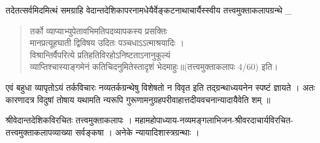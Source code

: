 तदेतत्सर्वमिदमित्थं समग्राहि वेदान्तदेशिकापरनामधेयैर्वेङ्कटनाथाचार्यैस्स्वीय तत्त्वमुक्ताकलापग्रन्थे \_
\begin{verse}
तर्को व्याप्याभ्युपेतावभिमतिपदव्यापकस्य प्रसक्तिः\\
मानप्रत्यूहघाती द्विविषय उदितः पञ्चधाऽऽत्माश्रयादिः ।\\
विश्रान्तिर्वैपरित्ये प्रतिहतिविरहोऽनिष्टताऽनानुकूल्यं\\
व्याप्तिश्चास्याङ्गमेनं कतिचिदनुमितेस्तादृशं भेदमाहुः॥(तत्त्वमुक्ताकलापः  4/60) इति।
\end{verse}
एवं बहुधा व्यापृतोऽयं तर्कविचारः नव्यतर्कग्रन्थेषु विशेषतो न विवृत इति तद्ग्रन्थाध्ययनेन स्पष्टं ज्ञायते । अतः कारणादत्र विदुषां तोषाय यथामति न्यरूपि गुरूणामनुग्रहपरीवाहात्तदीयवचनान्यादायैवेति शम् ॥

\begin{thebibliography}{99}
	श्रीवेदान्तदेशिकविरचितः तत्त्वमुक्ताकलापः ।
	महामहोपाध्याय-नव्यमङ्गलाभिजन-श्रीवरदाचार्यविरचित-तत्त्वमुक्ताकलापव्याख्या सर्वङ्कषा ।
	अनेके न्यायादिशास्त्रग्रन्थाः ।
\end{thebibliography}

\articleend
